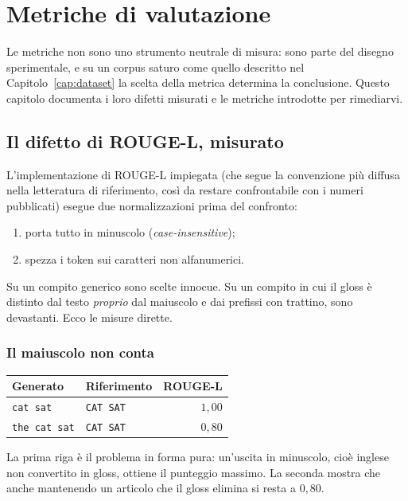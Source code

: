 \chapter{Metriche di valutazione}
\label{cap:metriche}

Le metriche non sono uno strumento neutrale di misura: sono parte del disegno
sperimentale, e su un corpus saturo come quello descritto nel
Capitolo~\ref{cap:dataset} la scelta della metrica determina la conclusione. Questo
capitolo documenta i loro difetti misurati e le metriche introdotte per
rimediarvi.

\section{Il difetto di ROUGE-L, misurato}
\label{sec:difetto-rouge}

L'implementazione di ROUGE-L impiegata (che segue la convenzione più diffusa
nella letteratura di riferimento, così da restare confrontabile con i numeri
pubblicati) esegue due normalizzazioni prima del confronto:

\begin{enumerate}
  \item porta tutto in minuscolo (\emph{case-insensitive});
  \item spezza i token sui caratteri non alfanumerici.
\end{enumerate}

Su un compito generico sono scelte innocue. Su un compito in cui il gloss è
distinto dal testo \emph{proprio} dal maiuscolo e dai prefissi con trattino, sono
devastanti. Ecco le misure dirette.

\subsection{Il maiuscolo non conta}

\begin{center}
\begin{tabular}{llr}
\toprule
Generato & Riferimento & ROUGE-L \\
\midrule
\texttt{cat sat} & \texttt{CAT SAT} & $1{,}00$ \\
\texttt{the cat sat} & \texttt{CAT SAT} & $0{,}80$ \\
\bottomrule
\end{tabular}
\end{center}

La prima riga è il problema in forma pura: un'uscita in minuscolo, cioè inglese
non convertito in gloss, ottiene il punteggio massimo. La seconda mostra che
anche mantenendo un articolo che il gloss elimina si resta a $0{,}80$.

